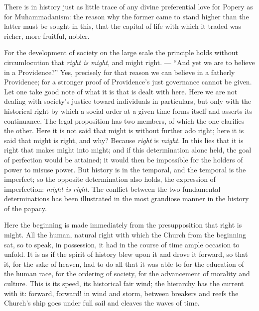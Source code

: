 \documentclass[12pt,a4paper,openany]{book}
\newcommand{\opage}[1]{\marginnote{\footnotesize\textit{[#1]}}}
\begin{document}
There is in history just as little trace of any divine   %
preferential love for Popery as for Muhammadanism:
the reason why the former came to stand higher
\setcounter{footnote}{0}%
\opage{301}than the latter must be sought in this, that the capital of life with which
it traded was richer, more fruitful, nobler.

For the development of society on the large scale the principle
holds without circumlocution that \emph{right is might}, and might
right. --- ``And yet we are to believe in a Providence?'' Yes,
precisely for that reason we can believe in a fatherly Providence; for a
stronger proof of Providence's just governance cannot
be given. Let one take good note of what it is that is dealt with here.
Here we are not dealing with society's justice
toward individuals in particulars, but only with the
historical right by which a social order at a given
time forms itself and asserts its continuance. The legal proposition
has two members, of which the one clarifies the other. Here it
is not said that might is without further ado right; here it is said that
might is right, and why? Because \emph{right} is \emph{might}. In this
lies that it is right that makes might into might;
and if this determination alone held, the goal of perfection
would be attained; it would then be impossible for the holders of power
to misuse power. But history is
in the temporal, and the temporal is the imperfect; so
the opposite determination also holds, the expression of imperfection:
\emph{might is right}. The conflict between
the two fundamental determinations has been illustrated in the most grandiose
manner in the history of the papacy.

Here the beginning is made immediately from the presupposition
that right is might. All the human, natural right
with which the Church from the beginning sat, so to speak, in possession,
it had in the course of time ample occasion to unfold. It
is as if the spirit of history blew upon it and drove it
forward, so that it, for the sake of heaven, had to do all
that it was able to for the education of the human race,
\setcounter{footnote}{0}%
\opage{302}for the ordering of society, for the advancement of morality and culture.
This is its speed, its historical fair wind;
the hierarchy has the current with it: forward, forward! in wind
and storm, between breakers and reefs the Church's
ship goes under full sail and cleaves the waves of time.
\end{document}
